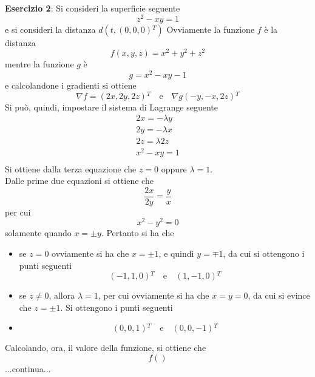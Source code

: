 \documentclass[a4paper]{extarticle}
\begin{document}
\vspace{2em}
\noindent
\textbf{Esercizio 2}: Si consideri la superficie seguente
\[z^2-xy = 1\]
e si consideri la distanza $d(t,(0,0,0){^T})$
Ovviamente la funzione $f$ è la distanza
\[f(x,y,z) = x^2 + y^2 + z^2\]
mentre la funzione $g$ è
\[g = x^2 - xy - 1\]
e calcolandone i gradienti si ottiene
\[\nabla f = (2x,2y,2z){^T} \hspace{1em} \text{e} \hspace{1em} \nabla g(-y,-x,2z){^T}\]
Si può, quindi, impostare il sistema di Lagrange seguente
\[
    \begin{array}{l}
        2x = -\lambda y\\
        2y = -\lambda x\\
        2z = \lambda 2z\\
        x^2 - xy = 1\\
    \end{array}
\]
Si ottiene dalla terza equazione che $z=0$ oppure $\lambda=1$.\\
Dalle prime due equazioni si ottiene che
\[\dfrac{2x}{2y} = \dfrac{y}{x}\]
per cui
\[x^2-y^2 = 0\]
solamente quando $x=\pm y$. Pertanto si ha che
\begin{itemize}
    \item se $z=0$ ovviamente si ha che $x=\pm 1$, e quindi $y=\mp 1$, da cui si ottengono i punti seguenti
    \[(-1,1,0){^T} \hspace{1em} \text{e} \hspace{1em} (1,-1,0){^T}\]
    \item se $z \neq 0$, allora $\lambda=1$, per cui ovviamente si ha che $x=y=0$, da cui si evince che $z=\pm 1$. Si ottengono i punti seguenti
    \item \[(0,0,1){^T} \hspace{1em} \text{e} \hspace{1em} (0,0,-1){^T}\]
\end{itemize}
Calcolando, ora, il valore della funzione, si ottiene che
\[f()\]
...continua...
\end{document}
